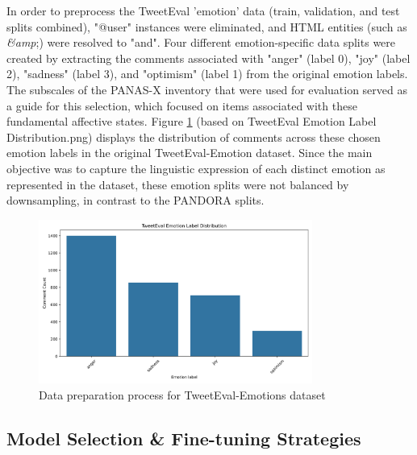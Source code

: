 \documentclass{DESSThesis}
\begin{document}
In order to preprocess the TweetEval 'emotion' data (train, validation, and test splits combined), "@user" instances were eliminated, and HTML entities (such as \textit{\&amp};) were resolved to "and". Four different emotion-specific data splits were created by extracting the comments associated with "anger" (label 0), "joy" (label 2), "sadness" (label 3), and "optimism" (label 1) from the original emotion labels. The subscales of the PANAS-X inventory that were used for evaluation served as a guide for this selection, which focused on items associated with these fundamental affective states. Figure \ref{fig:tweeteval_emotion_dist} (based on TweetEval Emotion Label Distribution.png) displays the distribution of comments across these chosen emotion labels in the original TweetEval-Emotion dataset. Since the main objective was to capture the linguistic expression of each distinct emotion as represented in the dataset, these emotion splits were not balanced by downsampling, in contrast to the PANDORA splits.

\begin{figure}[H]
    \centering
    \includegraphics[width=0.8\textwidth]{img/data_eda/9_emotion_barplot.png}
    \caption{Data preparation process for TweetEval-Emotions dataset}
    \label{fig:tweeteval_emotion_dist}
\end{figure}

\subsection{Model Selection \& Fine-tuning Strategies}
\end{document}
